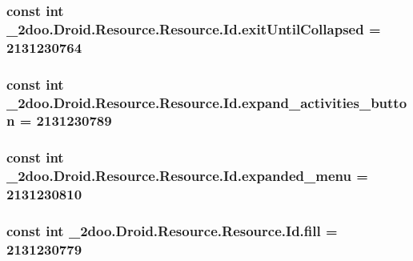\hypertarget{class__2doo_1_1_droid_1_1_resource_1_1_id_6b7734683029016245a2302180a48b6b}{
\subsubsection[{exitUntilCollapsed}]{\setlength{\rightskip}{0pt plus 5cm}const int \_\-2doo.Droid.Resource.Resource.Id.exitUntilCollapsed = 2131230764}}
\label{class__2doo_1_1_droid_1_1_resource_1_1_id_6b7734683029016245a2302180a48b6b}


\hypertarget{class__2doo_1_1_droid_1_1_resource_1_1_id_da9a9b988c0f2b80f9094615d2dd1ed0}{
\subsubsection[{expand\_\-activities\_\-button}]{\setlength{\rightskip}{0pt plus 5cm}const int \_\-2doo.Droid.Resource.Resource.Id.expand\_\-activities\_\-button = 2131230789}}
\label{class__2doo_1_1_droid_1_1_resource_1_1_id_da9a9b988c0f2b80f9094615d2dd1ed0}


\hypertarget{class__2doo_1_1_droid_1_1_resource_1_1_id_34af6713dbe482e9e555fea594c496a3}{
\subsubsection[{expanded\_\-menu}]{\setlength{\rightskip}{0pt plus 5cm}const int \_\-2doo.Droid.Resource.Resource.Id.expanded\_\-menu = 2131230810}}
\label{class__2doo_1_1_droid_1_1_resource_1_1_id_34af6713dbe482e9e555fea594c496a3}


\hypertarget{class__2doo_1_1_droid_1_1_resource_1_1_id_563cccddb45e9f559e130c819768a2a9}{
\subsubsection[{fill}]{\setlength{\rightskip}{0pt plus 5cm}const int \_\-2doo.Droid.Resource.Resource.Id.fill = 2131230779}}
\label{class__2doo_1_1_droid_1_1_resource_1_1_id_563cccddb45e9f559e130c819768a2a9}


